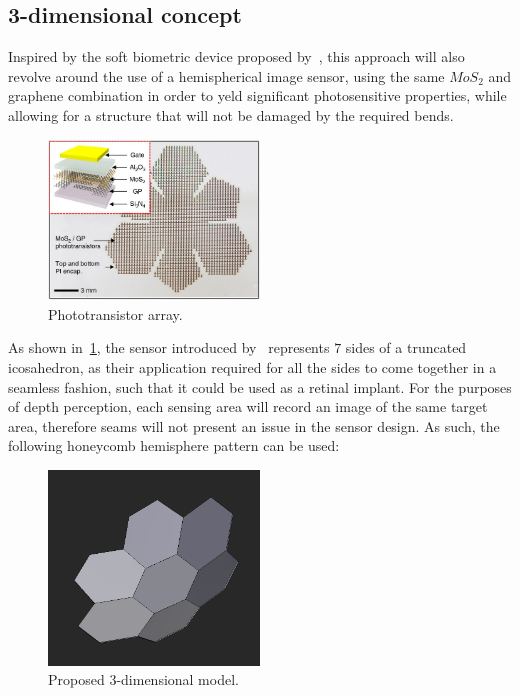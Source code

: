 \subsection*{3-dimensional concept}

Inspired by the soft biometric device proposed by~\cite{withHexagons}, this approach will also revolve
around the use of a hemispherical image sensor, using the same \(MoS_{2}\) and graphene combination in
order to yeld significant photosensitive properties, while allowing for a structure that will not be 
damaged by the required bends.

\begin{figure}[t]
    \includegraphics[width=0.50\textwidth, height=0.45\textwidth]{resources/png/paper_sensor.png}
    \caption{Phototransistor array.~\cite{withHexagons}~\label{figPaperSensor}}
\end{figure}

As shown in~\ref{figPaperSensor}, the sensor introduced by~\cite{withHexagons} represents \(7\) sides
of a truncated icosahedron, as their application required for all the sides to come together in a
seamless fashion, such that it could be used as a retinal implant. For the purposes of depth perception,
each sensing area will record an image of the same target area, therefore seams will not present an issue
in the sensor design. As such, the following honeycomb hemisphere pattern can be used:

\begin{figure}[t]
    \includegraphics[width=0.50\textwidth, height=0.50\textwidth]{resources/png/3d_model.png}
    \caption{Proposed 3-dimensional model.~\label{fig3DModel}}
\end{figure}

